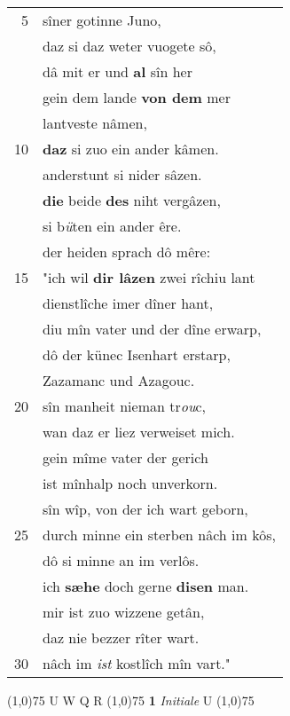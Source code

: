 \documentclass[8pt,a4paper,notitlepage]{article}
\begin{document}
\begin{table}[ht]
\begin{minipage}[t]{0.5\linewidth}
\begin{tabular}{rl}
5 & sîner gotinne Juno,\\ 
 & daz si daz weter vuogete sô,\\ 
 & dâ mit er und \textbf{al} sîn her\\ 
 & gein dem lande \textbf{von dem} mer\\ 
 & lantveste nâmen,\\ 
10 & \textbf{daz} si zuo ein ander kâmen.\\ 
 & anderstunt si nider sâzen.\\ 
 & \textbf{die} beide \textbf{des} niht vergâzen,\\ 
 & si b\textit{ü}ten ein ander êre.\\ 
 & der heiden sprach dô mêre:\\ 
15 & "ich wil \textbf{dir lâzen} zwei rîchiu lant\\ 
 & dienstlîche imer dîner hant,\\ 
 & diu mîn vater und der dîne erwarp,\\ 
 & dô der künec Isenhart erstarp,\\ 
 & Zazamanc und Azagouc.\\ 
20 & sîn manheit nieman tr\textit{ou}c,\\ 
 & wan daz er liez verweiset mich.\\ 
 & gein mîme vater der gerich\\ 
 & ist mînhalp noch unverkorn.\\ 
 & sîn wîp, von der ich wart geborn,\\ 
25 & durch minne ein sterben nâch im kôs,\\ 
 & dô si minne an im verlôs.\\ 
 & ich \textbf{sæhe} doch gerne \textbf{disen} man.\\ 
 & mir ist zuo wizzene getân,\\ 
 & daz nie bezzer rîter wart.\\ 
30 & nâch im \textit{ist} kostlîch mîn vart."\\ 
\end{tabular}
\scriptsize
\line(1,0){75} \newline
U W Q R \newline
\line(1,0){75} \newline
\textbf{1} \textit{Initiale} U  \newline
\line(1,0){75} \newline

\end{minipage}
\end{table}
\end{document}
